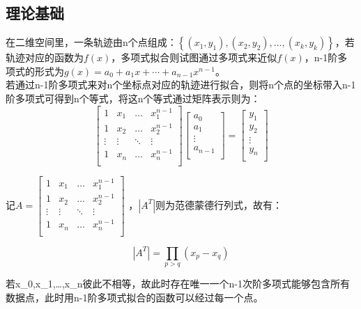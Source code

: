 \subsection{理论基础}
在二维空间里，一条轨迹由n个点组成：$\left\{\left(x_{1}, y_{1}\right),\left(x_{2}, y_{2}\right), \dots,\left(x_{k}, y_{k}\right)\right\}$，若轨迹对应的函数为$f(x)$，多项式拟合则试图通过多项式来近似$f(x)$，n-1阶多项式的形式为$g\left( x \right) =a_0+a_1x+\cdots +a_{n-1}x^{n-1}$。\\
若通过n-1阶多项式来对n个坐标点对应的轨迹进行拟合，则将n个点的坐标带入n-1阶多项式可得到n个等式，将这n个等式通过矩阵表示则为：
\begin{equation}
\label{vandermonde}
\left[ \begin{matrix}
	1&		x_1&		\dots&		x_{1}^{n-1}\\
	1&		x_2&		\dots&		x_{2}^{n-1}\\
	\vdots&		\vdots&		\ddots&		\vdots\\
	1&		x_n&		\dots&		x_{n}^{n-1}\\
\end{matrix} \right] \left[ \begin{array}{c}
	a_0\\
	a_1\\
	\vdots\\
	a_{n-1}\\
\end{array} \right] =\left[ \begin{array}{c}
	y_1\\
	y_2\\
	\vdots\\
	y_n\\
\end{array} \right] 
\end{equation}

记$A=\left[ \begin{matrix}
	1&		x_1&		\dots&		x_{1}^{n-1}\\
	1&		x_2&		\dots&		x_{2}^{n-1}\\
	\vdots&		\vdots&		\ddots&		\vdots\\
	1&		x_n&		\dots&		x_{n}^{n-1}\\
\end{matrix} \right] $
，$\left|A^{T}\right|$则为范德蒙德行列式，故有：

\begin{equation}
\left|A^{T}\right|=\prod_{p>q}\left(x_{p}-x_{q}\right)
\end{equation}

若x_0,x_1,…,x_n彼此不相等，故此时存在唯一一个n-1次阶多项式能够包含所有数据点，此时用n-1阶多项式拟合的函数可以经过每一个点。

